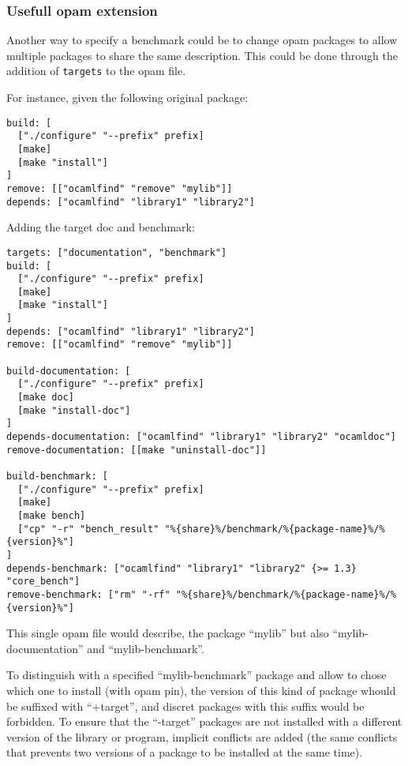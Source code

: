 \documentclass[11pt,a4paper]{article}
\begin{document}
\subsubsection{Usefull opam extension}

Another way to specify a benchmark could be to change opam packages to
allow multiple packages to share the same description. This could be
done through the addition of {\tt targets} to the opam file.

For instance, given the following original package:

\begin{verbatim}
build: [
  ["./configure" "--prefix" prefix]
  [make]
  [make "install"]
]
remove: [["ocamlfind" "remove" "mylib"]]
depends: ["ocamlfind" "library1" "library2"]
\end{verbatim}

Adding the target doc and benchmark:

\begin{verbatim}
targets: ["documentation", "benchmark"]
build: [
  ["./configure" "--prefix" prefix]
  [make]
  [make "install"]
]
depends: ["ocamlfind" "library1" "library2"]
remove: [["ocamlfind" "remove" "mylib"]]

build-documentation: [
  ["./configure" "--prefix" prefix]
  [make doc]
  [make "install-doc"]
]
depends-documentation: ["ocamlfind" "library1" "library2" "ocamldoc"]
remove-documentation: [[make "uninstall-doc"]]

build-benchmark: [
  ["./configure" "--prefix" prefix]
  [make]
  [make bench]
  ["cp" "-r" "bench_result" "%{share}%/benchmark/%{package-name}%/%{version}%"]
]
depends-benchmark: ["ocamlfind" "library1" "library2" {>= 1.3} "core_bench"]
remove-benchmark: ["rm" "-rf" "%{share}%/benchmark/%{package-name}%/%{version}%"]
\end{verbatim}

This single opam file would describe, the package ``mylib'' but also
``mylib-documentation'' and ``mylib-benchmark''.

To distinguish with a specified ``mylib-benchmark'' package and allow
to chose which one to install (with opam pin), the version of this
kind of package whould be suffixed with ``+target'', and discret
packages with this suffix would be forbidden. To ensure that the
``-target'' packages are not installed with a different version of the
library or program, implicit conflicts are added (the same conflicts
that prevents two versions of a package to be installed at the same
time).
\end{document}
